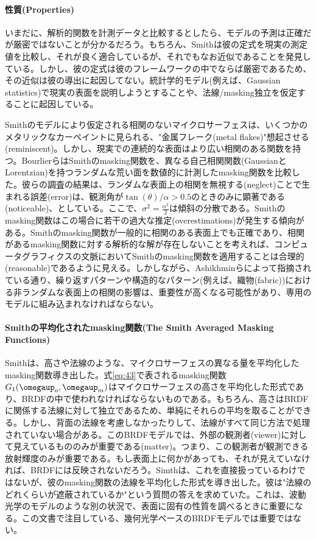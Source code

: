 \documentclass[a4j,xelatex,ja=standard]{bxjsarticle}
\begin{document}
\paragraph{性質(Properties)}

いまだに、解析的関数を計測データと比較するとしたら、モデルの予測は正確だが厳密ではないことが分かるだろう。もちろん、Smithは彼の定式を現実の測定値を比較し、それが良く適合しているが、それでもなお近似であることを発見している。しかし、彼の定式は彼のフレームワークの中でならば厳密であるため、その近似は彼の導出に起因してない。統計学的モデル(例えば、Gaussian statistics)で現実の表面を説明しようとすることや、法線/masking独立を仮定することに起因している。

Smithのモデルにより仮定される相関のないマイクロサーフェスは、いくつかのメタリックなカーペイントに見られる、"金属フレーク(metal flakes)"想起させる(reminiscent)。しかし、現実での連続的な表面はより広い相関のある関数を持つ。BourlierらはSmithのmasking関数を、異なる自己相関関数(GaussianとLorentzian)を持つランダムな荒い面を数値的に計測したmasking関数を比較した。彼らの調査の結果は、ランダムな表面上の相関を無視する(neglect)ことで生まれる誤差(error)は、観測角が$\tan(\theta) / \alpha > 0.5$のときのみに顕著である(noticeable)、としている。ここで、$\sigma^2 = \frac{\alpha^2}{2}$は傾斜の分散である。Smithのmasking関数はこの場合に若干の過大な推定(overestimations)が発生する傾向がある。Smithのmasking関数が一般的に相関のある表面上でも正確であり、相関があるmasking関数に対する解析的な解が存在しないことを考えれば、コンピュータグラフィクスの文脈においてSmithのmasking関数を適用することは合理的(reasonable)であるように見える。しかしながら、Ashikhminらによって指摘されている通り、繰り返すパターンや構造的なパターン(例えば、織物(fabric))における非ランダムな表面上の相関の影響は、重要性が高くなる可能性があり、専用のモデルに組み込まれなければならない。

\paragraph{Smithの平均化されたmasking関数(The Smith Averaged Masking Functions)}

Smithは、高さや法線のような、マイクロサーフェスの異なる量を平均化したmasking関数導き出した。式\eqref{eq:43}で表されるmasking関数$G_1(\boldsymbol{\omegaup}_o, \boldsymbol{\omegaup}_m)$はマイクロサーフェスの高さを平均化した形式であり、BRDFの中で使われなければならないものである。もちろん、高さはBRDFに関係する法線に対して独立であるため、単純にそれらの平均を取ることができる。しかし、背面の法線を考慮しなかったりして、法線がすべて同じ方法で処理されていない場合がある。このBRDFモデルでは、外部の観測者(viewer)に対して見えているもののみが重要である(matter)。つまり、この観測者が観測できる放射輝度のみが重要である。もし表面上に何かがあっても、それが見えていなければ、BRDFには反映されないだろう。Simthは、これを直接扱っているわけではないが、彼のmasking関数の法線を平均化した形式を導き出した。彼は"法線のどれくらいが遮蔽されているか"という質問の答えを求めていた。これは、波動光学のモデルのような別の状況で、表面に固有の性質を調べるときに重要になる。この文書で注目している、幾何光学ベースのBRDFモデルでは重要ではない。
\end{document}

